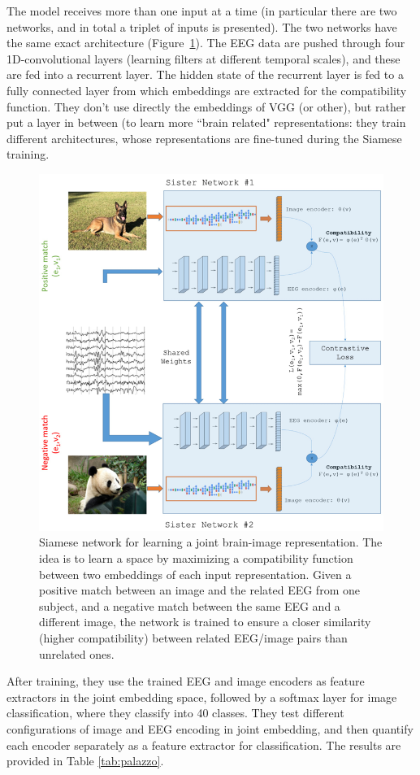 The model receives more than one input at a time (in particular there are two networks, and in total a triplet of inputs is presented). The two networks have the same exact architecture (Figure~\ref{fig:palazzo}). The EEG data are pushed through four 1D-convolutional layers (learning filters at different temporal scales), and these are fed into a recurrent layer. The hidden state of the recurrent layer is fed to a fully connected layer from which embeddings are extracted for the compatibility function.
They don't use directly the embeddings of VGG (or other), but rather put a layer in between (to learn more ``brain related" representations: they train different architectures, whose representations are fine-tuned during the Siamese training.

\begin{figure}[!ht]
    \centering
    \captionsetup{width=.8\linewidth}
    \includegraphics[width=0.6\linewidth]{images/palazzo.png}
    \caption{Siamese network for learning a joint brain-image representation. The idea is to learn a space by maximizing a compatibility function between two embeddings of each input representation. Given a positive match between an image and the related EEG from one subject, and a negative match between the same EEG and a different image, the network is trained to ensure a closer similarity (higher compatibility) between related EEG/image pairs than unrelated ones.}
    \label{fig:palazzo}
\end{figure}

After training, they use the trained EEG and image encoders as feature extractors in the joint embedding space, followed by a softmax layer for image classification, where they classify into 40 classes. They test different configurations of image and EEG encoding in joint embedding, and then quantify each encoder separately as a feature extractor for classification. The results are provided in Table \ref{tab:palazzo}.

